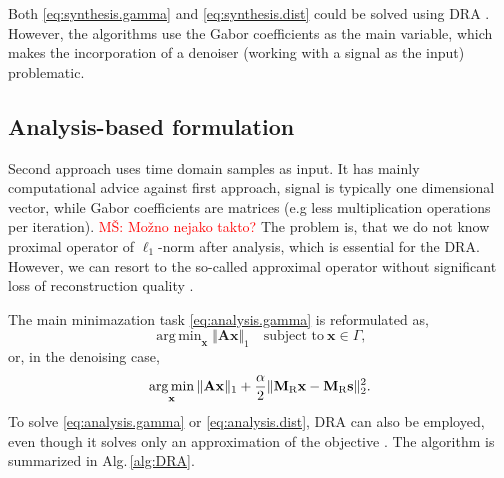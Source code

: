 \documentclass[conference]{IEEEtran}
\newcommand{\todo}[1]{\textcolor{red}{#1}}
\begin{document}
%
Both \eqref{eq:synthesis.gamma} and \eqref{eq:synthesis.dist} could be solved using DRA \cite{Mokry2020, Zaviska2021}.
However, the algorithms use the Gabor coefficients as the main variable, which makes the incorporation of a denoiser (working with a signal as the input) problematic.


\subsection{Analysis-based formulation}\label{subsec:timecoef}

Second approach uses time domain samples as input.
It has mainly computational advice against first approach, signal is typically one dimensional vector, while Gabor coefficients are matrices (e.g less multiplication operations per iteration).
\todo{MŠ: Možno nejako takto?}
The problem is,
that we do not know proximal operator of $ \ell_1 $-norm after analysis, which is essential for the DRA.
However, we can resort to the so-called approximal operator without significant loss of reconstruction quality \cite{Mokry2021}.

The main minimazation task \eqref{eq:analysis.gamma} is reformulated as,
\begin{equation}
	\label{eq:analysis.gamma}
	\mathop {\operatorname{arg \, min}}_\mathbf {x}\Vert \mathbf{A} \mathbf {x}\Vert _1 \quad \text{subject to}\ \mathbf {x}\in \Gamma,
\end{equation}
or, in the denoising case,
\begin{equation}
	\label{eq:analysis.dist}
	\mathop {\operatorname{arg \, min}}_\mathbf {x}\Vert \mathbf{A} \mathbf {x}\Vert _1 + \frac{\alpha}{2} \Vert \mathbf{M}_{\textup{R}} \mathbf {x} - \mathbf{M}_{\textup{R}} \mathbf{s} \Vert^2_2.
\end{equation} 
To solve \eqref{eq:analysis.gamma} or \eqref{eq:analysis.dist}, DRA can also be employed, even though it solves only an approximation of the objective \cite{Mokry2021}.
The algorithm is summarized in Alg.\,\ref{alg:DRA}.
\end{document}
